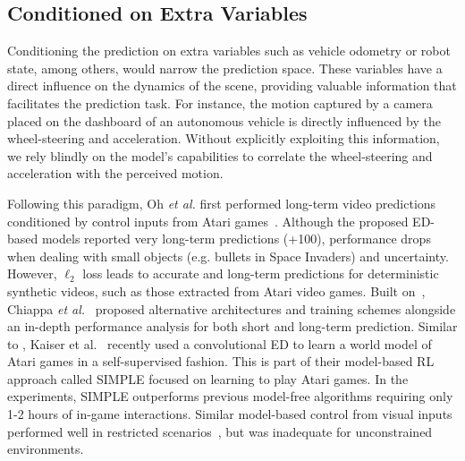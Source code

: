 \subsection{Conditioned on Extra Variables}
\label{subsec:m_condition}
Conditioning the prediction on extra variables such as vehicle odometry or robot state, among others, would narrow the prediction space. These variables have a direct influence on the dynamics of the scene, providing valuable information that facilitates the prediction task. For instance, the motion captured by a camera placed on the dashboard of an autonomous vehicle is directly influenced by the wheel-steering and acceleration. Without explicitly exploiting this information, we rely blindly on the model's capabilities to correlate the wheel-steering and acceleration with the perceived motion.

Following this paradigm, Oh \textit{et al.} first performed long-term video predictions conditioned by control inputs from Atari games~\cite{Oh2015}. Although the proposed \ac{ED}-based models reported very long-term predictions (+100), performance drops when dealing with small objects (e.g. bullets in Space Invaders) and uncertainty. However, $\ell_2$ loss leads to accurate and long-term predictions for deterministic synthetic videos, such as those extracted from Atari video games. Built on~\cite{Oh2015}, Chiappa \textit{et al.}~\cite{Chiappa2017} proposed alternative architectures and training schemes alongside an in-depth performance analysis for both short and long-term prediction. Similar to \cite{Oh2015}, Kaiser et al.~\cite{Kaiser2020} recently used a convolutional \ac{ED} to learn a world model of Atari games in a self-supervised fashion. This is part of their model-based \ac{RL} approach called \ac{SIMPLE} focused on learning to play Atari games. In the experiments, \ac{SIMPLE} outperforms previous model-free algorithms requiring only 1-2 hours of in-game interactions. Similar model-based control from visual inputs performed well in restricted scenarios~\cite{Fragkiadaki2016}, but was inadequate for unconstrained environments.

